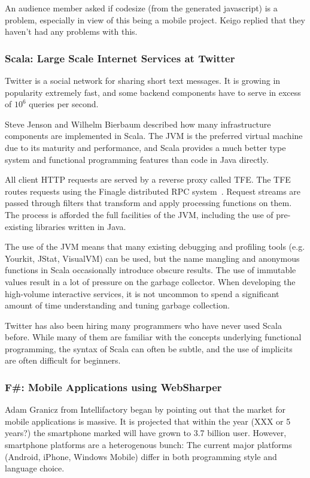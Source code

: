 \documentclass{jfp1}
\begin{document}
An audience member asked if codesize (from the generated javascript)
is a problem, especially in view of this being a mobile project.
Keigo replied that they haven't had any problems with this.

\subsubsection{Scala: Large Scale Internet Services at Twitter}

Twitter is a social network for sharing short text messages. It is growing in
popularity extremely fast, and some backend components have to serve in 
excess of $10^6$ queries per second.

Steve Jenson and Wilhelm Bierbaum described how many infrastructure components
are implemented in Scala.  The JVM is the preferred virtual machine due to its maturity
and performance, and Scala provides a much better type system and functional
programming features than code in Java directly.

All client HTTP requests are served by a reverse proxy called TFE. The TFE routes 
requests using the Finagle distributed RPC system~\cite{f}. Request streams are 
passed through filters that transform and apply processing functions on them. 
The process is afforded the full facilities of the JVM, including the use of pre-existing
libraries written in Java.

The use of the JVM means that many existing debugging and profiling tools (e.g.
Yourkit, JStat, VisualVM) can be used, but the name mangling and anonymous
functions in Scala occasionally introduce obscure results.  The use of immutable
values result in a lot of pressure on the garbage collector. When developing the 
high-volume interactive services, it is not uncommon to spend a significant amount
of time understanding and tuning garbage collection.

Twitter has also been hiring many programmers who have never used Scala before.
While many of them are familiar with the concepts underlying functional programming,
the syntax of Scala can often be subtle, and the use of implicits are often
difficult for beginners.

\subsubsection{F\#: Mobile Applications using WebSharper}

Adam Granicz from Intellifactory began by pointing out that the market for
mobile applications is massive.  It is projected that within the year (XXX or 5 years?)
the smartphone marked will have grown to 3.7 billion user.  However, smartphone
platforms are a heterogenous bunch: The current major platforms (Android, iPhone,
Windows Mobile) differ in both programming style and language choice.
\end{document}
